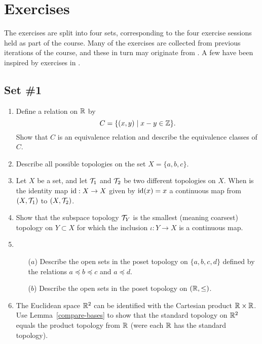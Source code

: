 \section{Exercises}
The exercises are split into four sets, corresponding to the four exercise sessions held as part of the course. Many of the exercises are collected from previous iterations of the course, and these in turn may originate from \cite{Mun}. A few have been inspired by exercises in \cite{DM}.

\subsection{Set \#1}

\begin{enumerate}
  \item Define a relation on $\mathbb{R}$ by
    \[
      C=\{(x,y) \mid x - y \in \mathbb{Z} \}.
    \]
    Show that $C$ is an equivalence relation and describe the equivalence classes of $C$.
  \item Describe all possible topologies on the set $X = \{a,b,c\}$.
  \item Let $X$ be a set, and let $\mathcal{T}_1$ and $\mathcal{T}_2$ be two different topologies on $X$. When is the identity map $\mathrm{id} : X \to X$ given by $\mathrm{id}(x) = x$ a continuous map from $(X,\mathcal{T}_1)$ to $(X,\mathcal{T}_2)$.
  \item
		Show that the subspace topology $\mathcal{T}_Y$ is the smallest (meaning coarsest) topology on $Y\subset X$ for which the inclusion $\iota:Y \rightarrow X$ is a continuous map.
	
  \item \begin{itemize}
		\item[($a$)] Describe the open sets in the poset topology on $\{a,b,c,d\}$ defined by the relations $a\preceq b\preceq c$ and $a\preceq d$.
		\item[($b$)] Describe the open sets in the poset topology on $(\mathbb{R},\leq)$.
	\end{itemize}
	
  \item The Euclidean space $\mathbb{R}^2$ can be identified with the Cartesian product $\mathbb{R} \times \mathbb{R}$. Use Lemma~\ref{compare-bases} to show that the standard topology on $\mathbb{R}^2$ equals the product topology from $\mathbb{R}$ (were each $\mathbb{R}$ has the standard topology).
  

\end{enumerate}

